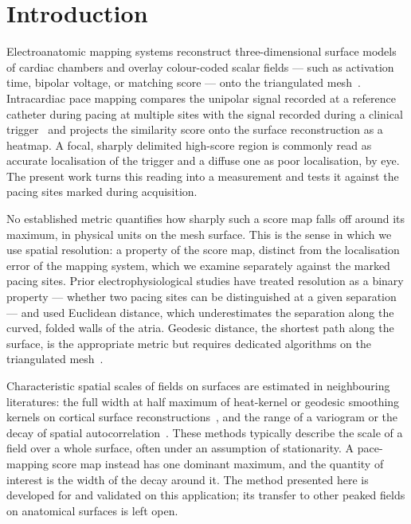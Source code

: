 \documentclass[a4paper,fleqn]{cas-dc}
\begin{document}
\section{Introduction}\label{sec:intro}

Electroanatomic mapping systems reconstruct three-dimensional surface
models of cardiac chambers and overlay colour-coded scalar fields ---
such as activation time, bipolar voltage, or matching score --- onto the
triangulated mesh~\citep{willert2024}.  Intracardiac pace mapping
compares the unipolar signal recorded at a reference catheter during
pacing at multiple sites with the signal recorded during a clinical
trigger~\citep{hayashi2016, lian2025} and projects the similarity score
onto the surface reconstruction as a heatmap.  A focal, sharply
delimited high-score region is commonly read as accurate localisation
of the trigger and a diffuse one as poor localisation, by eye.  The
present work turns this reading into a measurement and tests it against
the pacing sites marked during acquisition.

No established metric quantifies how sharply such a score map falls
off around its maximum, in physical units on the mesh surface.  This is
the sense in which we use spatial resolution: a property of the score
map, distinct from the localisation error of the mapping system, which
we examine separately against the marked pacing sites.  Prior electrophysiological
studies have treated resolution as a binary property --- whether two
pacing sites can be distinguished at a given
separation~\citep{kadish1991, azegami2005} --- and used Euclidean
distance, which underestimates the separation along the curved, folded
walls of the atria.  Geodesic distance, the shortest path along the
surface, is the appropriate metric but requires dedicated algorithms on
the triangulated mesh~\citep{grandits2024, williams2021}.

Characteristic spatial scales of fields on surfaces are estimated in
neighbouring literatures: the full width at half maximum of heat-kernel
or geodesic smoothing kernels on cortical surface
reconstructions~\citep{chung2005, hagler2006}, and the range of a
variogram or the decay of spatial autocorrelation~\citep{moran1950,
cressie1993}.  These methods typically describe the scale of a field
over a whole surface, often under an assumption of stationarity.  A
pace-mapping score map instead has one dominant maximum, and the quantity
of interest is the width of the decay around it.  The method presented
here is developed for and validated on this application; its transfer
to other peaked fields on anatomical surfaces is left open.
\end{document}
